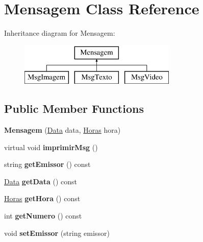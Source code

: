 \hypertarget{class_mensagem}{}\section{Mensagem Class Reference}
\label{class_mensagem}
Inheritance diagram for Mensagem\+:\begin{figure}[H]
\begin{center}
\leavevmode
\includegraphics[height=2.000000cm]{class_mensagem}
\end{center}
\end{figure}
\subsection*{Public Member Functions}
\begin{DoxyCompactItemize}
\item 
\hypertarget{class_mensagem_a4152f41a1dbfd03eb058d6a9926f4426}{}{\bfseries Mensagem} (\hyperlink{class_data}{Data} data, \hyperlink{class_horas}{Horas} hora)\label{class_mensagem_a4152f41a1dbfd03eb058d6a9926f4426}

\item 
\hypertarget{class_mensagem_a4490a1cfe88288fa1ff4b41327e769ed}{}virtual void {\bfseries imprimir\+Msg} ()\label{class_mensagem_a4490a1cfe88288fa1ff4b41327e769ed}

\item 
\hypertarget{class_mensagem_a5438dfe93aec2e6512042704e134d5db}{}string {\bfseries get\+Emissor} () const \label{class_mensagem_a5438dfe93aec2e6512042704e134d5db}

\item 
\hypertarget{class_mensagem_a8d3b52e1c20fac96c4df60c79b5b7846}{}\hyperlink{class_data}{Data} {\bfseries get\+Data} () const \label{class_mensagem_a8d3b52e1c20fac96c4df60c79b5b7846}

\item 
\hypertarget{class_mensagem_a7285a85c11aea596e25c6f87a68ad86f}{}\hyperlink{class_horas}{Horas} {\bfseries get\+Hora} () const \label{class_mensagem_a7285a85c11aea596e25c6f87a68ad86f}

\item 
\hypertarget{class_mensagem_a376309b58e69c41bf10acb7adad7bd3d}{}int {\bfseries get\+Numero} () const \label{class_mensagem_a376309b58e69c41bf10acb7adad7bd3d}

\item 
\hypertarget{class_mensagem_a74d42818d3796b28496f400e02328c92}{}void {\bfseries set\+Emissor} (string emissor)\label{class_mensagem_a74d42818d3796b28496f400e02328c92}

\end{DoxyCompactItemize}
